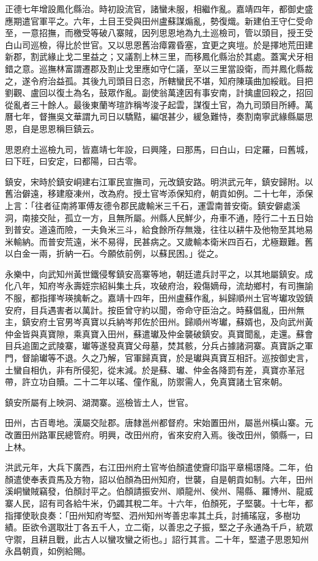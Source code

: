 \begin{pinyinscope}
正德七年增設鳳化縣治。時初設流官，諸蠻未服，相繼作亂。嘉靖四年，都御史盛應期遣官軍平之。六年，土目王受與田州盧蘇謀煽亂，勢復熾。新建伯王守仁受命至，一意招撫，而檄受等破八寨賊，因列思恩地為九土巡檢司，管以頭目，授王受白山司巡檢，得比於世官。又以思恩舊治瘴霧昏塞，宜更之爽塏。於是擇地荒田建新郡，割武緣止戈二里益之；又議割上林三里，而移鳳化縣治於其處。蓋寓犬牙相錯之意。巡撫林富謂遷郡及割止戈里應如守仁議，至以三里當設衛，而并鳳化縣裁之，遂令府治益孤。其後九司頭目日恣，所轄蠻民不堪，知府陳璜曲加綏戢。目把劉觀、盧回以復土為名，鼓眾作亂。副使翁萬達因有事安南，計擒盧回殺之，招回從亂者三十餘人。最後東蘭岑瑄詐稱岑浚子起雲，謀復土官，為九司頭目所縛。萬曆七年，督撫吳文華謂九司日以驕黠，編氓甚少，緩急難恃，奏割南寧武緣縣屬思恩，自是思恩稱巨鎮云。

思恩府土巡檢九司，皆嘉靖七年設，曰興隆，曰那馬，曰白山，曰定羅，曰舊城，曰下旺，曰安定，曰都陽，曰古零。

鎮安，宋時於鎮安峒建右江軍民宣撫司，元改鎮安路。明洪武元年，鎮安歸附。以舊治僻遠，移建廢凍州，改為府。授土官岑添保知府，朝貢如例。二十七年，添保上言：「往者征南將軍傅友德令郡民歲輸米三千石，運雲南普安衛。鎮安僻處溪洞，南接交阯，孤立一方，且無所屬。州縣人民鮮少，舟車不通，陸行二十五日始到普安。道遠而險，一夫負米三斗，給食餘所存無幾，往往以耕牛及他物至其地易米輸納。而普安荒遠，米不易得，民甚病之。又歲輸本衛米四百石，尤極艱難。舊以白金一兩，折納一石。今願依前例，以蘇民困。」從之。

永樂中，向武知州黃世鐵侵奪鎮安高寨等地，朝廷遣兵討平之，以其地屬鎮安。成化八年，知府岑永壽姪宗紹糾集土兵，攻破府治，殺傷嫡母，流劫鄉村，有司撫諭不服，都指揮岑瑛擒斬之。嘉靖十四年，田州盧蘇作亂，糾歸順州土官岑瓛攻毀鎮安府，目兵遇害者以萬計。按臣曾守約以聞，帝命守臣治之。時蘇倡亂，田州無主，鎮安府土官男岑真寶以兵納岑邦佐於田州。歸順州岑瓛，蘇婿也，及向武州黃仲金皆與真寶隙，乘真寶入田州，蘇遣瓛及仲金襲破鎮安。真寶聞亂，走還。蘇會目兵追圍之武陵寨，瓛等遂發真寶父母墓，焚其骸，分兵占據諸洞寨。真寶訴之軍門，督諭瓛等不退。久之乃解，官軍歸真寶，於是瓛與真寶互相訐。巡按御史言，土蠻自相仇，非有所侵犯，從末減。於是蘇、瓛、仲金各降罰有差，真寶亦革冠帶，許立功自贖。二十二年以瑤、僮作亂，防禦需人，免真寶諸土官來朝。

鎮安所屬有上映洞、湖潤寨。巡檢皆土人，世官。

田州，古百粵地。漢屬交阯郡。唐隸邕州都督府。宋始置田州，屬邕州橫山寨。元改置田州路軍民總管府。明興，改田州府，省來安府入焉。後改田州，領縣一，曰上林。

洪武元年，大兵下廣西，右江田州府土官岑伯顏遣使齎印詣平章楊璟降。二年，伯顏遣使奉表貢馬及方物，詔以伯顏為田州知府，世襲，自是朝貢如制。六年，田州溪峒蠻賊竊發，伯顏討平之。伯顏請振安州、順龍州、侯州、陽縣、羅博州、龍威寨人民，詔有司各給牛米，仍蠲其稅二年。十六年，伯顏死，子堅襲。十七年，都指揮使耿良奏：「田州知府岑堅、泗州知州岑善忠率其土兵，討捕瑤寇，多樹功績。臣欲令選取壯丁各五千人，立二衛，以善忠之子振，堅之子永通為千戶，統眾守禦，且耕且戰，此古人以蠻攻蠻之術也。」詔行其言。二十年，堅遣子思恩知州永昌朝貢，如例給賜。


\end{pinyinscope}
